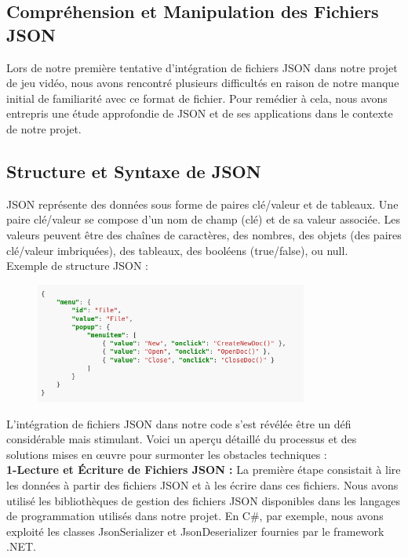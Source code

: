 \subsection*{Compréhension et Manipulation des Fichiers JSON}
Lors de notre première tentative d'intégration de fichiers JSON dans notre projet de jeu vidéo, nous avons 
rencontré plusieurs difficultés en raison de notre manque initial de familiarité avec ce format de fichier. Pour remédier à cela, 
nous avons entrepris une étude approfondie de JSON et de ses applications dans le contexte de notre projet.

\subsection*{Structure et Syntaxe de JSON}
JSON représente des données sous forme de paires clé/valeur et de tableaux. Une paire clé/valeur se compose d'un nom de champ (clé) et de sa valeur associée. 
Les valeurs peuvent être des chaînes de caractères, des nombres, des objets (des paires clé/valeur imbriquées), des tableaux, des booléens (true/false), ou null.
\\

Exemple de structure JSON : 

\begin{figure}[H]
      \centering
      \includegraphics[width=0.8\textwidth]{assets/jsonexemple.png}
      
      \label{fig:json}
  \end{figure}

L'intégration de fichiers JSON dans notre code s'est révélée être un défi considérable mais stimulant. 
Voici un aperçu détaillé du processus et des solutions mises en œuvre pour surmonter les obstacles techniques :
\\

\textbf{1-Lecture et Écriture de Fichiers JSON :}
La première étape consistait à lire les données à partir des fichiers JSON et à les écrire dans ces fichiers. 
Nous avons utilisé les bibliothèques de gestion des fichiers JSON disponibles dans les langages de programmation utilisés dans notre projet.
 En C\#, par exemple, nous avons exploité les classes JsonSerializer et JsonDeserializer fournies par le framework .NET.
\\

